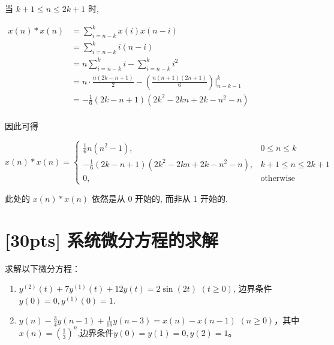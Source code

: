 \documentclass[a4paper,UTF8]{article}
\numberwithin{equation}{section}
\begin{document}
\begin{framed}
\begin{spacing}{1.5}
\begin{itemize}
      当 $k+1 \le n \le 2k+1$ 时,
      
      $
      \begin{aligned}
      x(n) * x(n) & = \sum_{i=n-k}^{k}x(i)x(n-i)  \\
      & = \sum_{i=n-k}^{k}i(n-i)  \\
      & = n\sum_{i=n-k}^{k}i-\sum_{i=n-k}^{k}i^{2}  \\
      & = n\cdot \frac{n (2 k - n + 1)}{2}-(\frac{n(n+1)(2n+1)}{6})|_{n-k-1}^{k}  \\
      & = - \frac{1}{6}(2 k - n + 1) (2 k^{2} - 2 k n + 2 k - n^{2} - n) \\
      \end{aligned}
      $
      
      因此可得
      
      $x(n) * x(n) = \begin{cases}
        \frac{1}{6}n (n^{2} - 1), & 0 \le n \le k \\
        - \frac{1}{6}(2 k - n + 1) (2 k^{2} - 2 k n + 2 k - n^{2} - n), & k+1 \le n \le 2k+1 \\
        0, & \text{otherwise}
      \end{cases}$
      
      此处的 $x(n) * x(n)$ 依然是从 0 开始的, 而非从 1 开始的.
    \end{itemize}
\end{spacing}
\end{framed}


\newpage
\section{[30pts] 系统微分方程的求解 }
求解以下微分方程：
\begin{enumerate}[(1)]
	\item $y^{(2)}(t)+7y^{(1)}(t)+12y(t)=2\sin(2t)$ $(t\geqslant0)$, 边界条件$y(0)=0,y^{(1)}(0)=1$.
	\item $y(n)-\displaystyle\frac{3}{4}y(n-1)+\frac{1}{16}y(n-3)=x(n)-x(n-1)$ $(n\geqslant0)$，其中$x(n)=\displaystyle\left(\frac{1}{3}\right)^n$,边界条件$y(0)=y(1)=0,y(2)=1$。
\end{enumerate}
\end{document}

